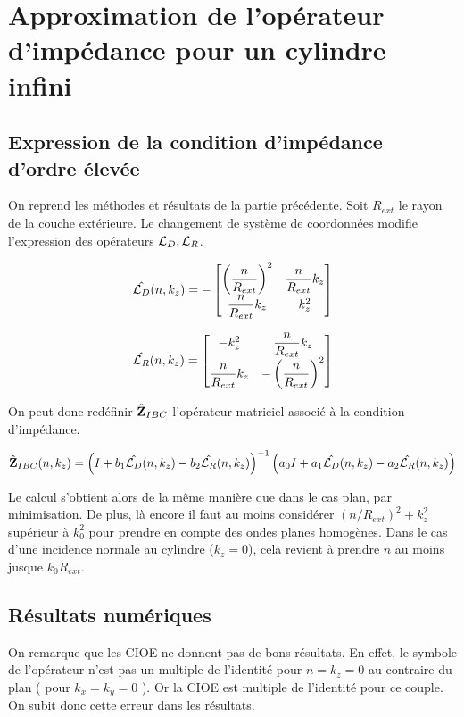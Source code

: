 \section{Approximation de l'opérateur d'impédance pour un cylindre infini}

  \subsection{Expression de la condition d'impédance d'ordre élevée}

    On reprend les méthodes et résultats de la partie précédente.
    Soit \(R_{ext}\) le rayon de la couche extérieure.
    Le changement de système de coordonnées modifie l'expression des opérateurs \({\mathcal{L}_D}, {\mathcal{L}_R}\).

    \begin{equation}
      \hat{{\mathcal{L}_D}}(n,k_z) = -
      \begin{bmatrix}
        \left(\dfrac{n}{R_{ext}}\right)^2 & \dfrac{n}{R_{ext}} k_z
        \\
        \dfrac{n}{R_{ext}} k_z & k_z^2
      \end{bmatrix}
    \end{equation}

    \begin{equation}
      \hat{{\mathcal{L}_R}}(n,k_z) =
      \begin{bmatrix}
        -k_z^2 & \dfrac{n}{R_{ext}} k_z
        \\
        \dfrac{n}{R_{ext}} k_z & -\left(\dfrac{n}{R_{ext}}\right)^2
      \end{bmatrix}
    \end{equation}

    On peut donc redéfinir \(\hat{\mathbf{Z}}_{IBC}\) l’opérateur matriciel associé à la condition d'impédance. 

    \begin{align}
        \hat{\mathbf{Z}}_{IBC}(n,k_z) = \left(I + b_1 \hat{{\mathcal{L}_D}}(n,k_z) - b_2 \hat{{\mathcal{L}_R}}(n,k_z) \right)^{-1} \left(a_0 I + a_1 \hat{{\mathcal{L}_D}}(n,k_z) - a_2 \hat{{\mathcal{L}_R}}(n,k_z)\right)
    \end{align}

    Le calcul s'obtient alors de la même manière que dans le cas plan, par minimisation. 
    De plus, là encore il faut au moins considérer \((n\slash R_{ext})^2 + k_z^2\) supérieur à \(k_0^2\) pour prendre en compte des ondes planes homogènes. Dans le cas d'une incidence normale au cylindre (\(k_z = 0 \)), cela revient à prendre \(n\) au moins jusque \(k_0 R_{ext}\).

  \subsection{Résultats numériques}

    On remarque que les CIOE ne donnent pas de bons résultats. En effet, le symbole de l'opérateur n'est pas un multiple de l'identité pour \(n=k_z=0\) au contraire du plan ( pour \(k_x=k_y=0\) ). Or la CIOE est multiple de l'identité pour ce couple. On subit donc cette erreur dans les résultats.